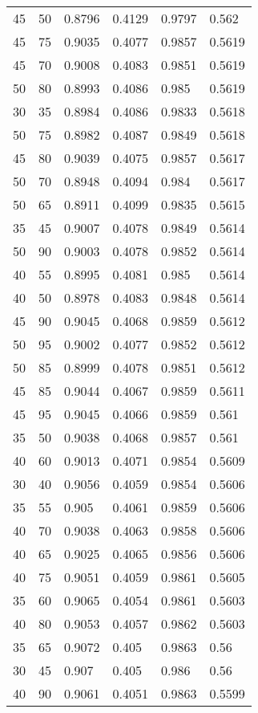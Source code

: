 \begin{center}
\begin{longtable}{|l|l|l|l|l|l|}
45 & 50 & 0.8796 & 0.4129 & 0.9797 & 0.562  \\
45 & 75 & 0.9035 & 0.4077 & 0.9857 & 0.5619 \\
45 & 70 & 0.9008 & 0.4083 & 0.9851 & 0.5619 \\
50 & 80 & 0.8993 & 0.4086 & 0.985  & 0.5619 \\
30 & 35 & 0.8984 & 0.4086 & 0.9833 & 0.5618 \\
50 & 75 & 0.8982 & 0.4087 & 0.9849 & 0.5618 \\
45 & 80 & 0.9039 & 0.4075 & 0.9857 & 0.5617 \\
50 & 70 & 0.8948 & 0.4094 & 0.984  & 0.5617 \\
50 & 65 & 0.8911 & 0.4099 & 0.9835 & 0.5615 \\
35 & 45 & 0.9007 & 0.4078 & 0.9849 & 0.5614 \\
50 & 90 & 0.9003 & 0.4078 & 0.9852 & 0.5614 \\
40 & 55 & 0.8995 & 0.4081 & 0.985  & 0.5614 \\
40 & 50 & 0.8978 & 0.4083 & 0.9848 & 0.5614 \\
45 & 90 & 0.9045 & 0.4068 & 0.9859 & 0.5612 \\
50 & 95 & 0.9002 & 0.4077 & 0.9852 & 0.5612 \\
50 & 85 & 0.8999 & 0.4078 & 0.9851 & 0.5612 \\
45 & 85 & 0.9044 & 0.4067 & 0.9859 & 0.5611 \\
45 & 95 & 0.9045 & 0.4066 & 0.9859 & 0.561  \\
35 & 50 & 0.9038 & 0.4068 & 0.9857 & 0.561  \\
40 & 60 & 0.9013 & 0.4071 & 0.9854 & 0.5609 \\
30 & 40 & 0.9056 & 0.4059 & 0.9854 & 0.5606 \\
35 & 55 & 0.905  & 0.4061 & 0.9859 & 0.5606 \\
40 & 70 & 0.9038 & 0.4063 & 0.9858 & 0.5606 \\
40 & 65 & 0.9025 & 0.4065 & 0.9856 & 0.5606 \\
40 & 75 & 0.9051 & 0.4059 & 0.9861 & 0.5605 \\
35 & 60 & 0.9065 & 0.4054 & 0.9861 & 0.5603 \\
40 & 80 & 0.9053 & 0.4057 & 0.9862 & 0.5603 \\
35 & 65 & 0.9072 & 0.405  & 0.9863 & 0.56   \\
30 & 45 & 0.907  & 0.405  & 0.986  & 0.56   \\
40 & 90 & 0.9061 & 0.4051 & 0.9863 & 0.5599 \\

\end{longtable}
\end{center}
